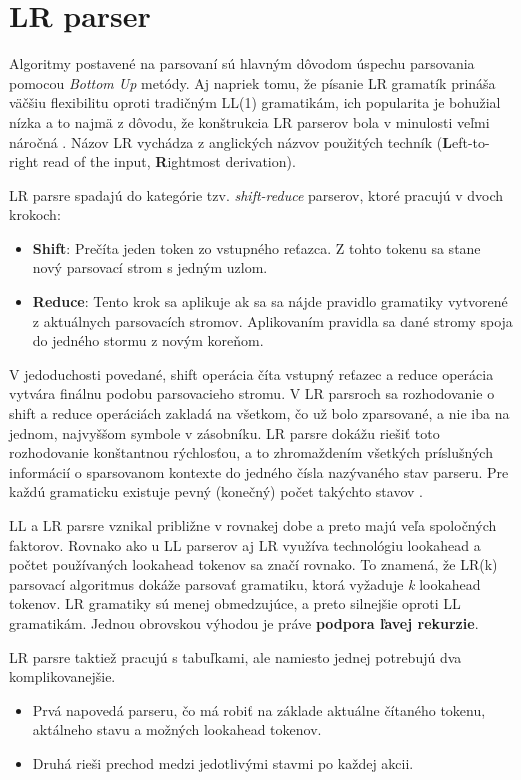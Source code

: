 \section{LR parser}\label{LR}
Algoritmy postavené na  parsovaní sú hlavným dôvodom úspechu parsovania pomocou \textit{Bottom Up} metódy. Aj napriek tomu, že písanie LR gramatík prináša väčšiu flexibilitu oproti tradičným LL(1) gramatikám, ich popularita je bohužial nízka a to najmä z dôvodu, že konštrukcia LR parserov bola v minulosti veľmi náročná \cite{tomassetti:parsing}. Názov LR vychádza z anglických názvov použitých techník (\textbf{L}eft-to-right read of the input, \textbf{R}ightmost derivation).

LR parsre spadajú do kategórie tzv. \textit{shift-reduce} parserov, ktoré pracujú v dvoch krokoch:
\begin{itemize}
\item \textbf{Shift}: Prečíta jeden token zo vstupného reťazca. Z tohto tokenu sa stane nový parsovací strom s jedným uzlom.
\item \textbf{Reduce}: Tento krok sa aplikuje ak sa sa nájde pravidlo gramatiky vytvorené z aktuálnych parsovacích stromov. Aplikovaním pravidla sa dané stromy spoja do jedného stormu z novým koreňom.
\end{itemize}

V jedoduchosti povedané, shift operácia číta vstupný reťazec a reduce operácia vytvára finálnu podobu parsovacieho stromu. V LR parsroch sa rozhodovanie o shift a reduce operáciách zakladá na všetkom, čo už bolo zparsované, a nie iba na jednom, najvyššom symbole v zásobníku. LR parsre dokážu riešiť toto rozhodovanie konštantnou rýchlosťou, a to zhromaždením všetkých príslušných informácií o sparsovanom kontexte do jedného čísla nazývaného stav parseru. Pre každú gramaticku existuje pevný (konečný) počet takýchto stavov \cite{LR}.

LL a LR parsre vznikal približne v rovnakej dobe a preto majú veľa spoločných faktorov. Rovnako ako u LL parserov aj LR využíva technológiu lookahead a počtet používaných lookahead tokenov sa značí rovnako. To znamená, že LR(k) parsovací algoritmus dokáže parsovať gramatiku, ktorá vyžaduje \textit{k} lookahead tokenov. LR gramatiky sú menej obmedzujúce, a preto silnejšie oproti LL gramatikám. Jednou obrovskou výhodou je práve \textbf{podpora ľavej rekurzie}.

LR parsre taktiež pracujú s tabuľkami, ale namiesto jednej potrebujú dva komplikovanejšie. 
\begin{itemize}
\item Prvá napovedá parseru, čo má robiť na základe aktuálne čítaného tokenu, aktálneho stavu a možných lookahead tokenov.
\item Druhá rieši prechod medzi jedotlivými stavmi po každej akcii.
\end{itemize}


